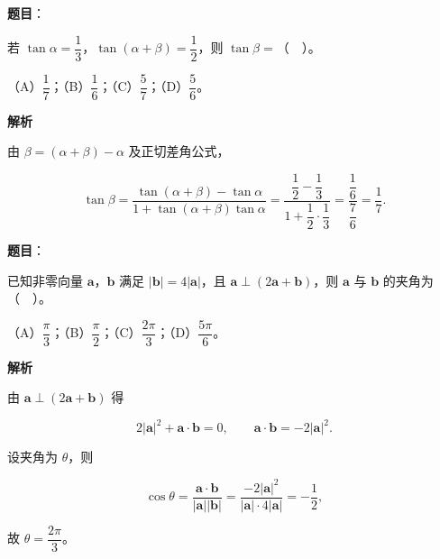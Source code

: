 \begin{answer}

\textbf{题目}：

若 $\tan\alpha=\dfrac{1}{3}$，$\tan(\alpha+\beta)=\dfrac{1}{2}$，则 $\tan\beta=$（　）。

（A）$\dfrac{1}{7}$；（B）$\dfrac{1}{6}$；（C）$\dfrac{5}{7}$；（D）$\dfrac{5}{6}$。

\textbf{解析}

由 $\beta=(\alpha+\beta)-\alpha$ 及正切差角公式，

\nopagebreak[4]
\[
\tan\beta=\frac{\tan(\alpha+\beta)-\tan\alpha}{1+\tan(\alpha+\beta)\tan\alpha}
=\frac{\dfrac{1}{2}-\dfrac{1}{3}}{1+\dfrac{1}{2}\cdot\dfrac{1}{3}}
=\frac{\dfrac{1}{6}}{\dfrac{7}{6}}
=\frac{1}{7}.
\]


\end{answer}
\begin{answer}

\textbf{题目}：

已知非零向量 $\boldsymbol{a}$，$\boldsymbol{b}$ 满足 $|\boldsymbol{b}|=4|\boldsymbol{a}|$，且 $\boldsymbol{a}\perp(2\boldsymbol{a}+\boldsymbol{b})$，则 $\boldsymbol{a}$ 与 $\boldsymbol{b}$ 的夹角为（　）。

（A）$\dfrac{\pi}{3}$；（B）$\dfrac{\pi}{2}$；（C）$\dfrac{2\pi}{3}$；（D）$\dfrac{5\pi}{6}$。

\textbf{解析}

由 $\boldsymbol{a}\perp(2\boldsymbol{a}+\boldsymbol{b})$ 得

\nopagebreak[4]
\[
2|\boldsymbol{a}|^{2}+\boldsymbol{a}\cdot\boldsymbol{b}=0,
\qquad
\boldsymbol{a}\cdot\boldsymbol{b}=-2|\boldsymbol{a}|^{2}.
\]

设夹角为 $\theta$，则

\nopagebreak[4]
\[
\cos\theta=\frac{\boldsymbol{a}\cdot\boldsymbol{b}}{|\boldsymbol{a}||\boldsymbol{b}|}
=\frac{-2|\boldsymbol{a}|^{2}}{|\boldsymbol{a}|\cdot 4|\boldsymbol{a}|}
=-\frac{1}{2},
\]

故 $\theta=\dfrac{2\pi}{3}$。


\end{answer}
